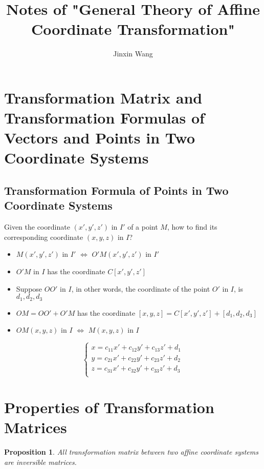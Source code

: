 \documentclass[onecolumn]{ctexart}
\title{Notes of "General Theory of Affine Coordinate Transformation"}
\author{Jinxin Wang}
\date{}
\newtheorem{proposition}{Proposition}
\begin{document}
\maketitle

\section{Transformation Matrix and Transformation Formulas of Vectors and Points in Two Coordinate Systems}

\subsection{Transformation Formula of Points in Two Coordinate Systems}

Given the coordinate $(x', y', z')$ in $I'$ of a point $M$, how to find its 
corresponding coordinate $(x, y, z)$ in $I$?
\begin{itemize}
  \item $M (x', y', z')$ in $I'$ $\Leftrightarrow$ $O'M (x', y', z')$ in $I'$
  \item $O'M$ in $I$ has the coordinate $C [x', y', z']$
  \item Suppose $OO'$ in $I$, in other words, the coordinate of the point $O'$ in $I$, is $d_1, d_2, d_3$
  \item $OM = OO' + O'M$ has the coordinate $[x, y, z] = C [x', y', z'] + [d_1, d_2, d_3]$
  \item $OM(x, y, z)$ in $I$ $\Leftrightarrow$ $M (x, y, z)$ in $I$
\end{itemize}

\begin{equation}
  \begin{cases}
    x = c_{11} x' + c_{12} y' + c_{13} z' + d_1 \\
    y = c_{21} x' + c_{22} y' + c_{23} z' + d_2 \\
    z = c_{31} x' + c_{32} y' + c_{33} z' + d_3 \\
  \end{cases}
\end{equation}

\section{Properties of Transformation Matrices}

\begin{proposition}
  All transformation matrix between two affine coordinate systems are inversible 
  matrices.
\end{proposition}
\end{document}
